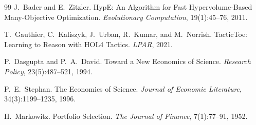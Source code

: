 \documentclass[11pt]{article}
\begin{document}
\begin{thebibliography}{99}
J.~Bader and E.~Zitzler.
\newblock HypE: An Algorithm for Fast Hypervolume-Based
Many-Objective Optimization.
\newblock \emph{Evolutionary Computation}, 19(1):45--76, 2011.

T.~Gauthier, C.~Kaliszyk, J.~Urban, R.~Kumar, and
M.~Norrish.
\newblock TacticToe: Learning to Reason with HOL4 Tactics.
\newblock \emph{LPAR}, 2021.

P.~Dasgupta and P.~A.~David.
\newblock Toward a New Economics of Science.
\newblock \emph{Research Policy}, 23(5):487--521, 1994.

P.~E.~Stephan.
\newblock The Economics of Science.
\newblock \emph{Journal of Economic Literature}, 34(3):1199--1235,
1996.

H.~Markowitz.
\newblock Portfolio Selection.
\newblock \emph{The Journal of Finance}, 7(1):77--91, 1952.

\end{thebibliography}
\end{document}
